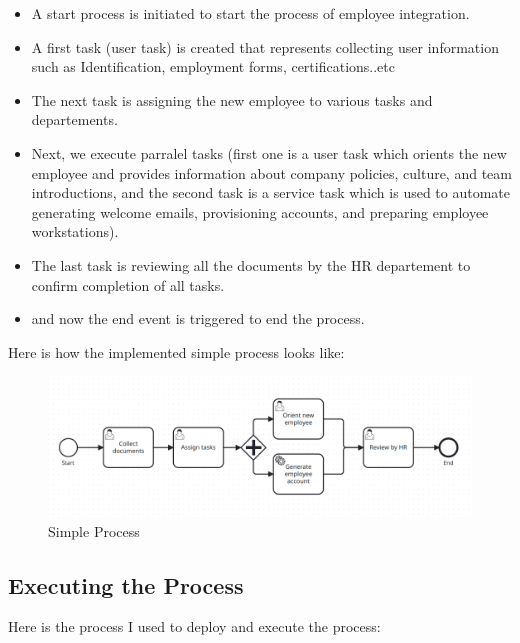 \documentclass[12pt]{article}
\begin{document}
{  \begin{itemize}
    \item A start process is initiated to start the process of employee integration.
    \item A first task (user task) is created that represents collecting user information such as Identification, employment forms, certifications..etc
    \item The next task is assigning the new employee to various tasks and departements.
    \item Next, we execute parralel tasks (first one is a user task which orients the new employee and provides information about company policies, culture, and team introductions, and the second task is a service task which is used to automate generating welcome emails, provisioning accounts, and preparing employee workstations).
    \item The last task is reviewing all the documents by the HR departement to confirm completion of all tasks.
    \item and now the end event is triggered to end the process.
  \end{itemize}

  \pagebreak

  Here is how the implemented simple process looks like:

  \begin{figure}[h]
    \centering
    \includegraphics[width=.90\linewidth]{simple_process.png}
    \caption{Simple Process}
    \label{fig:simple_process}
  \end{figure}

  \subsection{Executing the Process}

  Here is the process I used to deploy and execute the process:

}
\end{document}
